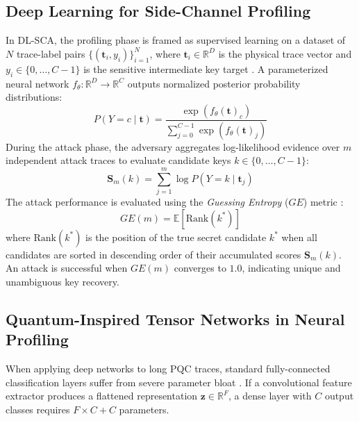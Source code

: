 \documentclass[letterpaper]{article}
\begin{document}
\subsection{Deep Learning for Side-Channel Profiling}
In DL-SCA, the profiling phase is framed as supervised learning on a dataset of $N$ trace-label pairs $\{(\mathbf{t}_i, y_i)\}_{i=1}^N$, where $\mathbf{t}_i \in \mathbb{R}^D$ is the physical trace vector and $y_i \in \{0, \dots, C-1\}$ is the sensitive intermediate key target \cite{maghrebi2016deep,benadjila2020deep}. A parameterized neural network $f_\theta: \mathbb{R}^D \to \mathbb{R}^C$ outputs normalized posterior probability distributions:
\begin{equation}
P(Y = c \mid \mathbf{t}) = \frac{\exp(f_\theta(\mathbf{t})_c)}{\sum_{j=0}^{C-1} \exp(f_\theta(\mathbf{t})_j)}
\label{eq:softmax_prob}
\end{equation}
During the attack phase, the adversary aggregates log-likelihood evidence over $m$ independent attack traces to evaluate candidate keys $k \in \{0, \dots, C-1\}$:
\begin{equation}
\mathbf{S}_m(k) = \sum_{j=1}^m \log P(Y = k \mid \mathbf{t}_j)
\label{eq:log_likelihood}
\end{equation}
The attack performance is evaluated using the \textit{Guessing Entropy} ($GE$) metric \cite{standaert2009unified}:
\begin{equation}
GE(m) = \mathbb{E} \left[ \text{Rank}(k^*) \right]
\label{eq:ge_def}
\end{equation}
where $\text{Rank}(k^*)$ is the position of the true secret candidate $k^*$ when all candidates are sorted in descending order of their accumulated scores $\mathbf{S}_m(k)$. An attack is successful when $GE(m)$ converges to $1.0$, indicating unique and unambiguous key recovery.

\subsection{Quantum-Inspired Tensor Networks in Neural Profiling}
When applying deep networks to long PQC traces, standard fully-connected classification layers suffer from severe parameter bloat \cite{ueno2022curse}. If a convolutional feature extractor produces a flattened representation $\mathbf{z} \in \mathbb{R}^{F}$, a dense layer with $C$ output classes requires $F \times C + C$ parameters. 
\end{document}
